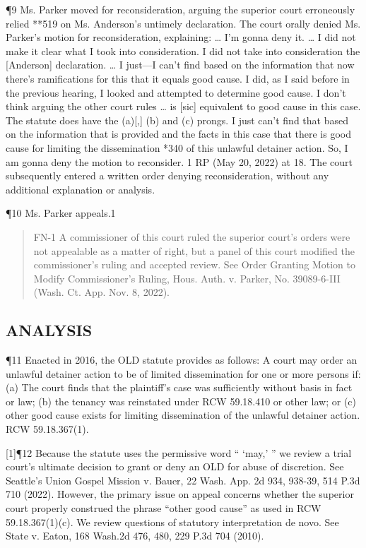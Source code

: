 \documentclass[11pt]{article}
\begin{document}
¶9 Ms. Parker moved for reconsideration, arguing the superior court erroneously relied **519 on Ms. Anderson’s untimely declaration. The court orally denied Ms. Parker’s motion for reconsideration, explaining:
\ldots{} I’m gonna deny it. \ldots{} I did not make it clear what I took into consideration. I did not take into consideration the [Anderson] declaration. \ldots{}
I just—I can’t find based on the information that now there’s ramifications for this that it equals good cause. I did, as I said before in the previous hearing, I looked and attempted to determine good cause. I don’t think arguing the other court rules \ldots{} is [sic] equivalent to good cause in this case. The statute does have the (a)[,] (b) and (c) prongs. I just can’t find that based on the information that is provided and the facts in this case that there is good cause for limiting the dissemination *340 of this unlawful detainer action. So, I am gonna deny the motion to reconsider.
1 RP (May 20, 2022) at 18. The court subsequently entered a written order denying reconsideration, without any additional explanation or analysis.

¶10 Ms. Parker appeals.1

\begin{quote}
FN-1 A commissioner of this court ruled the superior court’s orders were not appealable as a matter of right, but a panel of this court modified the commissioner’s ruling and accepted review. See Order Granting Motion to Modify Commissioner’s Ruling, Hous. Auth. v. Parker, No. 39089-6-III (Wash. Ct. App. Nov. 8, 2022).
\end{quote}

\subsection{ANALYSIS}
\label{sec:orged7b606}
¶11 Enacted in 2016, the OLD statute provides as follows:
A court may order an unlawful detainer action to be of limited dissemination for one or more persons if: (a) The court finds that the plaintiff’s case was sufficiently without basis in fact or law;
(b) the tenancy was reinstated under RCW 59.18.410 or other law; or (c) other good cause exists for limiting dissemination of the unlawful detainer action.
RCW 59.18.367(1).

[1]¶12 Because the statute uses the permissive word “ ‘may,’ ” we review a trial court’s ultimate decision to grant or deny an OLD for abuse of discretion. See Seattle’s Union Gospel Mission v. Bauer, 22 Wash. App. 2d 934, 938-39, 514 P.3d 710 (2022). However, the primary issue on appeal concerns whether the superior court properly construed the phrase “other good cause” as used in RCW 59.18.367(1)(c). We review questions of statutory interpretation de novo. See State v. Eaton, 168 Wash.2d 476, 480, 229 P.3d 704 (2010).
\end{document}
